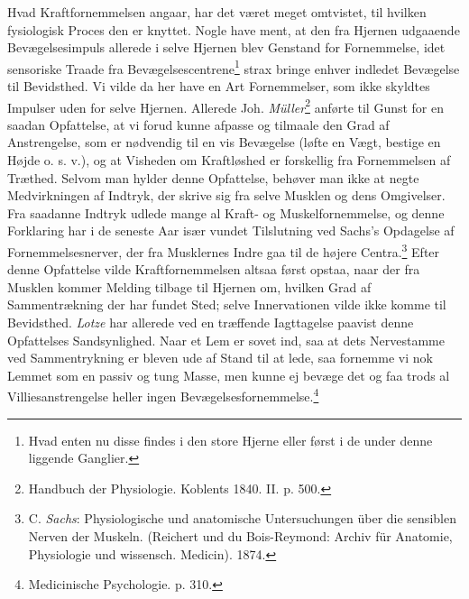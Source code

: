 \documentclass[12pt,a4paper,openany]{book}
\newcommand{\opage}[1]{\marginnote{\footnotesize\textit{[#1]}}}
\begin{document}
Hvad Kraftfornemmelsen angaar, har det været meget omtvistet, til
hvilken fysiologisk Proces den er knyttet. Nogle have ment, at den fra
Hjernen udgaaende Bevægelsesimpuls allerede i selve Hjernen blev
Genstand for Fornemmelse, idet sensoriske Traade fra
Bevægelsescentrene\footnote[1]{Hvad enten nu disse findes i den store
Hjerne eller først i de under denne liggende Ganglier.} strax bringe
enhver indledet Bevægelse til Bevidsthed. Vi vilde da her have en Art
Fornemmelser, som ikke skyldtes Impulser uden for selve Hjernen.
Allerede Joh. \emph{Müller}\footnote[2]{Handbuch der Physiologie.
Koblents 1840. II. p. 500.} anførte til Gunst for en saadan Opfattelse,
at vi forud kunne afpasse og tilmaale den Grad af Anstrengelse, som er
nødvendig til en vis Bevægelse (løfte en Vægt, bestige en Højde o. s.
v.), og at Visheden om
\opage{146}Kraftløshed er forskellig fra Fornemmelsen af Træthed. Selvom
man hylder denne Opfattelse, behøver man ikke at negte Medvirkningen af
Indtryk, der skrive sig fra selve Musklen og dens Omgivelser. Fra
saadanne Indtryk udlede mange al Kraft- og Muskelfornemmelse, og denne
Forklaring har i de seneste Aar især vundet Tilslutning ved Sachs’s
Opdagelse af Fornemmelsesnerver, der fra Musklernes Indre gaa til de
højere Centra.\footnote[1]{C. \emph{Sachs}: Physiologische und
anatomische Untersuchungen über die sensiblen Nerven der Muskeln.
(Reichert und du Bois-Reymond: Archiv für Anatomie, Physiologie und
wissensch. Medicin). 1874.} Efter denne Opfattelse vilde
Kraftfornemmelsen altsaa først opstaa, naar der fra Musklen kommer
Melding tilbage til Hjernen om, hvilken Grad af Sammentrækning der har
fundet Sted; selve Innervationen vilde ikke komme til Bevidsthed.
\emph{Lotze} har allerede ved en træffende Iagttagelse paavist denne
Opfattelses Sandsynlighed. Naar et Lem er sovet ind, saa at dets
Nervestamme ved Sammentrykning er bleven ude af Stand til at lede, saa
fornemme vi nok Lemmet som en passiv og tung Masse, men kunne ej bevæge
det og faa trods al Villiesanstrengelse heller ingen
Bevægelsesfornemmelse.\footnote[2]{Medicinische Psychologie. p. 310.}
\end{document}
